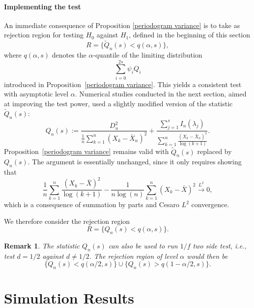 \documentclass[12pt]{article}
\numberwithin{equation}{section}
\newtheorem{remark}{Remark}[section]
\begin{document}
\paragraph{Implementing the test} An immediate consequence of Proposition  \ref {periodogram variance} is to take as rejection region for testing $H_0$ against $H_1$, defined in the beginning of this section 
\[
R=\{\tilde Q_n(s)<q(\alpha,s)\},
\]
where $q(\alpha,s)$ denotes the $\alpha$-quantile of the limiting distribution
\[
\sum_{i=0}^{2s}\psi_i Q_i
\]
introduced in Proposition~\ref{periodogram variance}. This yields a consistent test with asymptotic level $\alpha$. Numerical studies conducted in the next section, aimed at improving the test power, used a slightly modified version 
 of the statistic $\tilde Q_n(s)$:
\[
Q_n(s):=\frac{D_n^2}{\frac{1}{n}{\displaystyle\sum_{k=1}^n(X_k-\bar X_n)^2}}
+\frac{\displaystyle\sum_{j=1}^s I_n(\lambda_j)}
{\displaystyle\sum_{k=1}^n\frac{(X_k-\bar X_n)^2}{\log(k+1)}}.
\]
Proposition~\ref{periodogram variance} remains valid with $\tilde Q_n(s)$ replaced by $Q_n(s)$. The argument is essentially unchanged, since it only requires showing that
\[
\frac{1}{n}\sum_{k=1}^n\frac{(X_k-\bar X)^2}{\log(k+1)}-
\frac{1}{n\log(n)}\sum_{k=1}^n (X_k-\bar X)^2\overset{L^2}{\longrightarrow}0,
\]
which is a consequence of summation by parts and Cesaro $L^2$ convergence. 


We therefore consider the rejection region 
\[
R=\{Q_n(s)<q(\alpha,s)\}.
\]
\begin{remark}
    The statistic $Q_n(s)$ can also be used to run $1/f$ two side test, i.e., test $d=1/2$ against $d\neq 1/2$. The rejection region of level $\alpha$ would then be 
    \[
\{Q_n(s)<q(\alpha/2,s)\}\cup\{Q_n(s)>q(1-\alpha/2,s)\}.
\]
\end{remark}
\section{Simulation Results}\label{robinson sim}
\end{document}
